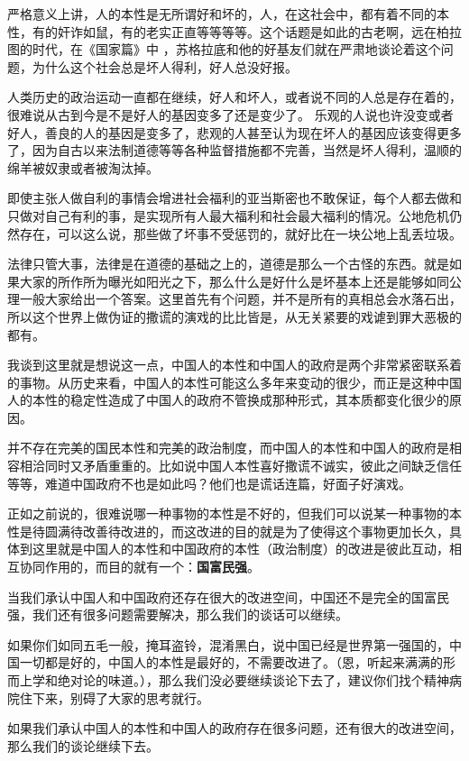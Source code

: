 \documentclass[12pt,oneside]{book}
\begin{document}
\begin{common-format}
严格意义上讲，人的本性是无所谓好和坏的，人，在这社会中，都有着不同的本性，有的奸诈如鼠，有的老实正直等等等等。这个话题是如此的古老啊，远在柏拉图的时代，在《国家篇》中 ，苏格拉底和他的好基友们就在严肃地谈论着这个问题，为什么这个社会总是坏人得利，好人总没好报。

人类历史的政治运动一直都在继续，好人和坏人，或者说不同的人总是存在着的，很难说从古到今是不是好人的基因变多了还是变少了。 乐观的人说也许没变或者好人，善良的人的基因是变多了，悲观的人甚至认为现在坏人的基因应该变得更多了，因为自古以来法制道德等等各种监督措施都不完善，当然是坏人得利，温顺的绵羊被奴隶或者被淘汰掉。

即使主张人做自利的事情会增进社会福利的亚当斯密也不敢保证，每个人都去做和只做对自己有利的事，是实现所有人最大福利和社会最大福利的情况。公地危机仍然存在，可以这么说，那些做了坏事不受惩罚的，就好比在一块公地上乱丢垃圾。

法律只管大事，法律是在道德的基础之上的，道德是那么一个古怪的东西。就是如果大家的所作所为曝光如阳光之下，那么什么是好什么是坏基本上还是能够如同公理一般大家给出一个答案。这里首先有个问题，并不是所有的真相总会水落石出，所以这个世界上做伪证的撒谎的演戏的比比皆是，从无关紧要的戏谑到罪大恶极的都有。

我谈到这里就是想说这一点，中国人的本性和中国人的政府是两个非常紧密联系着的事物。从历史来看，中国人的本性可能这么多年来变动的很少，而正是这种中国人的本性的稳定性造成了中国人的政府不管换成那种形式，其本质都变化很少的原因。

并不存在完美的国民本性和完美的政治制度，而中国人的本性和中国人的政府是相容相洽同时又矛盾重重的。比如说中国人本性喜好撒谎不诚实，彼此之间缺乏信任等等，难道中国政府不也是如此吗？他们也是谎话连篇，好面子好演戏。

正如之前说的，很难说哪一种事物的本性是不好的，但我们可以说某一种事物的本性是待圆满待改善待改进的，而这改进的目的就是为了使得这个事物更加长久，具体到这里就是中国人的本性和中国政府的本性（政治制度）的改进是彼此互动，相互协同作用的，而目的就有一个：\textbf{国富民强}。﻿

当我们承认中国人和中国政府还存在很大的改进空间，中国还不是完全的国富民强，我们还有很多问题需要解决，那么我们的谈话可以继续。

如果你们如同五毛一般，掩耳盗铃，混淆黑白，说中国已经是世界第一强国的，中国一切都是好的，中国人的本性是最好的，不需要改进了。（恩，听起来满满的形而上学和绝对论的味道。），那么我们没必要继续谈论下去了，建议你们找个精神病院住下来，别碍了大家的思考就行。

如果我们承认中国人的本性和中国人的政府存在很多问题，还有很大的改进空间，那么我们的谈论继续下去。


\end{common-format}
\end{document}
